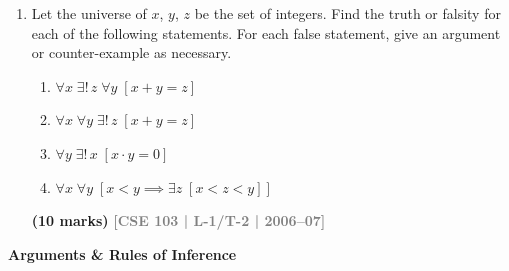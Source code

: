 \documentclass[12pt,a3paper]{article}
\newcommand{\yr}[1]{\hfill\textcolor{gray}{\small\textbf{[#1]}}}
\newcommand{\mk}[1]{\textcolor{orange!70!black}{\small\textbf{(#1 marks)}}}
\newcommand{\subtopic}[2]{%
  \vspace{10pt}
  \noindent\begin{tcolorbox}[colback=#1!8,colframe=#1,boxrule=0.6pt,arc=4pt,
    left=6pt,right=6pt,top=4pt,bottom=4pt]
    \small\bfseries\textcolor{#1}{#2}
  \end{tcolorbox}
  \vspace{2pt}
}
\begin{document}
\begin{enumerate}
\item Let the universe of $x$, $y$, $z$ be the set of integers. Find the truth or falsity for each of the following statements. For each false statement, give an argument or counter-example as necessary.
\begin{enumerate}
  \item $\forall x\; \exists!\, z\; \forall y\;[x + y = z]$
  \item $\forall x\; \forall y\; \exists!\, z\;[x + y = z]$
  \item $\forall y\; \exists!\, x\;[x \cdot y = 0]$
  \item $\forall x\; \forall y\;[x < y \implies \exists z\;[x < z < y]]$
\end{enumerate}
\mk{10} \yr{CSE 103 | L-1/T-2 | 2006--07}



\end{enumerate}

\subtopic{cA}{Arguments \& Rules of Inference}
\label{sub:s1-proplogic-inference}
\end{document}
